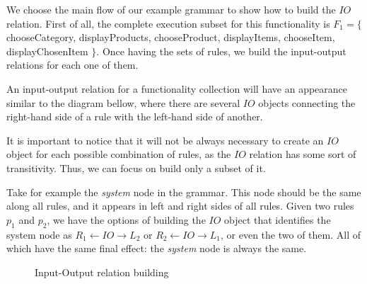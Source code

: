   We choose the main flow of our example grammar to show how to build the $IO$ relation. First of all, the complete execution subset for this functionality is $F_1 = \{$ chooseCategory, displayProducts, chooseProduct, displayItems, chooseItem, displayChosenItem $\}$. Once having the sets of rules, we build the input-output relations for each one of them.

\begin{example}\label{ex:inout}  An input-output relation for a functionality collection will have an appearance similar to the diagram bellow, where there are several $IO$ objects connecting the right-hand side of a rule with the left-hand side of another.


\hfill\break

  It is important to notice that it will not be always necessary to create an $IO$ object for each possible combination of rules, as the $IO$ relation has some sort of transitivity. Thus, we can focus on build only a subset of it.

  Take for example the \emph{system} node in the grammar. This node should be the same along all rules, and it appears in left and right sides of all rules. Given two rules $p_1$ and $p_2$, we have the options of building the $IO$ object that identifies the system node as $R_1 \leftarrow IO \rightarrow L_2$ or $R_2 \leftarrow IO \rightarrow L_1$, or even the two of them. All of which have the same final effect: the \emph{system} node is always the same.

\begin{figure}[!ht]
  \centering
  \caption{Input-Output relation building}\label{fig:tests:inout}
\end{figure}

\end{example}

